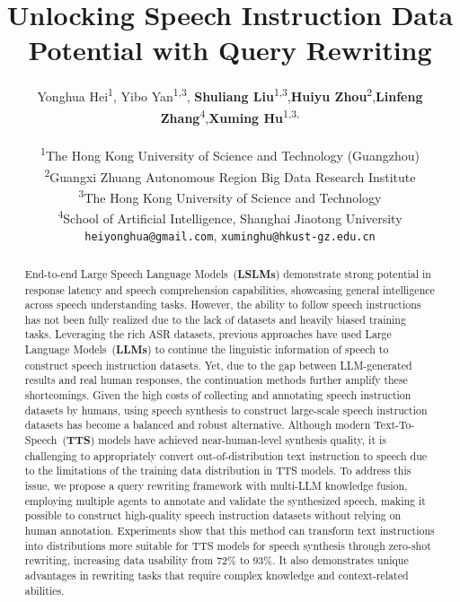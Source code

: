 \documentclass[11pt]{article}
\title{Unlocking Speech Instruction Data Potential with Query Rewriting}
\author{Yonghua Hei\textsuperscript{\rm 1}, Yibo Yan\textsuperscript{\rm 1,\rm 3}, \textbf{Shuliang Liu}\textsuperscript{\rm 1,\rm 3},\textbf{Huiyu Zhou}\textsuperscript{\rm 2},\textbf{Linfeng Zhang}\textsuperscript{\rm 4},\textbf{Xuming Hu}\textsuperscript{\rm 1,\rm 3,}\footnotemark[2]\\
	\\
	\textsuperscript{\rm 1}The Hong Kong University of Science and Technology (Guangzhou)\\
	\textsuperscript{\rm 2}Guangxi Zhuang Autonomous Region Big Data Research Institute \\
	\textsuperscript{\rm 3}The Hong Kong University of Science and Technology \\
	\textsuperscript{\rm 4}School of Artificial Intelligence, Shanghai Jiaotong University\\
	\texttt{heiyonghua@gmail.com}, \texttt{xuminghu@hkust-gz.edu.cn}
}
\begin{document}
	\maketitle
	\renewcommand{\thefootnote}{\fnsymbol{footnote}}
	\renewcommand{\thefootnote}{\arabic{footnote}}
	
	
	\begin{abstract}
	End-to-end Large Speech Language Models~(\textbf{LSLMs}) demonstrate strong potential in response latency and speech comprehension capabilities, showcasing general intelligence across speech understanding tasks. However, the ability to follow speech instructions has not been fully realized due to the lack of datasets and heavily biased training tasks. Leveraging the rich ASR datasets, previous approaches have used Large Language Models~(\textbf{LLMs}) to continue the linguistic information of speech to construct speech instruction datasets. Yet, due to the gap between LLM-generated results and real human responses, the continuation methods further amplify these shortcomings. Given the high costs of collecting and annotating speech instruction datasets by humans, using speech synthesis to construct large-scale speech instruction datasets has become a balanced and robust alternative. Although modern Text-To-Speech~(\textbf{TTS}) models have achieved near-human-level synthesis quality, it is challenging to appropriately convert out-of-distribution text instruction to speech due to the limitations of the training data distribution in TTS models. To address this issue, we propose a query rewriting framework with multi-LLM knowledge fusion, employing multiple agents to annotate and validate the synthesized speech, making it possible to construct high-quality speech instruction datasets without relying on human annotation. Experiments show that this method can transform text instructions into distributions more suitable for TTS models for speech synthesis through zero-shot rewriting, increasing data usability from 72\% to 93\%.  It also demonstrates unique advantages in rewriting tasks that require complex knowledge and context-related abilities.

	\end{abstract}
	
\end{document}
